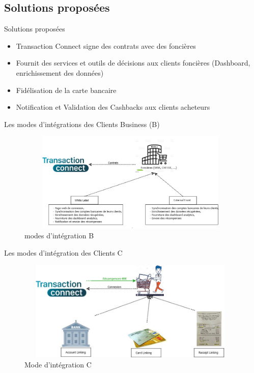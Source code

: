 \documentclass{beamer}
\begin{document}
\subsection{Solutions proposées}
\begin{frame}{Solutions proposées}
\begin{itemize}
		\item Transaction Connect signe des contrats avec des foncières
		\item Fournit des services et outils de décisions aux clients foncières (Dashboard, enrichissement des données)
		\item Fidélisation de la carte bancaire
		\item Notification et Validation des Cashbacks aux clients acheteurs
\end{itemize}
\end{frame}
\begin{frame}{Les modes d'intégrations des Clients Business (B)}
\begin{figure}[H]
    \includegraphics[width=11cm,height=4.8cm]{images/business_links.png}
    \caption{ modes d'intégration B}
    \label{fig:L1}
\end{figure}
\end{frame}
\begin{frame}{Les modes d'intégration des Clients C}
\begin{figure}[H]
    \includegraphics[width=11cm,height=4.8cm]{images/client_links.png}
    \caption{ Mode d'intégration C}
    \label{fig:L1}
\end{figure}
\end{frame}
\end{document}
